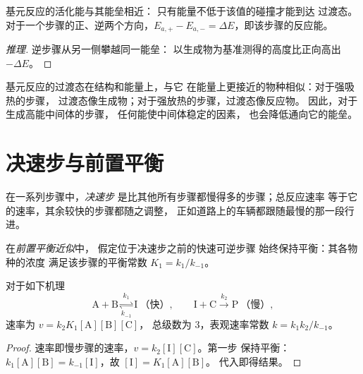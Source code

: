 \begin{proposition}[能垒与阿伦尼乌斯定律]\label{prop:b1:elementary-steps:barrier}
基元反应的活化能与其能垒相近：
只有能量不低于该值的碰撞才能到达
过渡态。对于一个步骤的正、逆两个方向，$E_{a,+} -
E_{a,-} = \Delta E$，即该步骤的反应能。
\end{proposition}

\begin{proof}[推理]
逆步骤从另一侧攀越同一能垒：
以生成物为基准测得的高度比正向高出 $-\Delta E$。
\end{proof}

\begin{proposition}[哈蒙德假设]\label{prop:b1:elementary-steps:hammond}
基元反应的过渡态在结构和能量上，与它
在能量上更接近的物种相似：对于强吸热的步骤，
过渡态像生成物；对于强放热的步骤，过渡态像反应物。
因此，对于生成高能中间体的步骤，
任何能使中间体稳定的因素，
也会降低通向它的能垒。
\end{proposition}
\admitted

\section{决速步与前置平衡}

\begin{definition}[决速步]\label{def:b1:elementary-steps:rds}
在一系列步骤中，\emph{决速步}
是比其他所有步骤都慢得多的步骤；总反应速率
等于它的速率，其余较快的步骤都随之调整，
正如道路上的车辆都跟随最慢的那一段行进。
\end{definition}

\begin{definition}[前置平衡近似]\label{def:b1:elementary-steps:pre-equilibrium}
在\emph{前置平衡近似}中，
假定位于决速步之前的快速可逆步骤
始终保持平衡：其各物种的浓度
满足该步骤的平衡常数 $K_1 = k_1/k_{-1}$。
\end{definition}

\begin{proposition}[由前置平衡导出的速率方程]\label{prop:b1:elementary-steps:pre-equilibrium-law}
对于如下机理
\[
  \mathrm{A} + \mathrm{B} \underset{k_{-1}}{\overset{k_1}{\rightleftharpoons}} \mathrm{I}
  \ \text{（快）}, \qquad
  \mathrm{I} + \mathrm{C} \xrightarrow{\ k_2\ } \mathrm{P} \ \text{（慢）},
\]
速率为 $v = k_2K_1[\mathrm{A}][\mathrm{B}][\mathrm{C}]$，
总级数为 3，表观速率常数 $k = k_1k_2/k_{-1}$。
\end{proposition}

\begin{proof}
速率即慢步骤的速率，$v = k_2[\mathrm{I}][\mathrm{C}]$。第一步
保持平衡：$k_1[\mathrm{A}][\mathrm{B}] =
k_{-1}[\mathrm{I}]$，故 $[\mathrm{I}] = K_1[\mathrm{A}][\mathrm{B}]$。
代入即得结果。
\end{proof}

